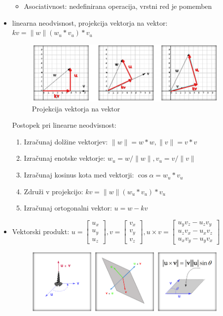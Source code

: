 \documentclass{article}
\begin{document}
\begin{itemize}
\begin{itemize}
    \item Asociativnost: nedefinirana operacija, vrstni red je pomemben
\end{itemize}
\item linearna neodvisnost, projekcija vektorja na vektor: $kv = \lVert w \rVert (w_u * v_u)*v_u$
\begin{figure}[H]
\centering
\includegraphics[width=100mm]{src/projekcija_vektorja_na_vektor.png}
\caption{Projekcija vektorja na vektor}
\end{figure}
Postopek pri linearne neodvisnost:
\begin{enumerate}
    \item Izračunaj dolžine vektorjev: $\lVert w \rVert = w * w, \lVert v \rVert = v * v$ 
    \item Izračunaj enotske vektorje: $w_u = w/ \lVert w \rVert, v_u = v/ \lVert v \rVert$
    \item Izračunaj kosinus kota med vektorji: $\cos{\alpha} = w_u * v_u$
    \item Združi v projekcijo: $kv = \lVert w \rVert (w_u * v_u)*v_u$
    \item Izračunaj ortogonalni vektor: $u = w - kv$
\end{enumerate}
\item Vektorski produkt: $u = \begin{bmatrix} u_x \\ u_y \\ u_z \end{bmatrix}, v = \begin{bmatrix} v_x \\ v_y \\ v_z \end{bmatrix}, u \times v = \begin{bmatrix} u_yv_z - u_zv_y \\ u_zv_x - u_xv_z \\ u_xv_y - u_yv_x \end{bmatrix}$
\begin{figure}[H]
\centering
\includegraphics[width=100mm]{src/vektorski_produkt.png}

\end{figure}
\end{itemize}
\end{document}

